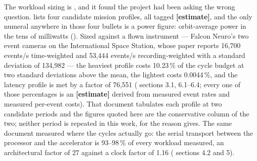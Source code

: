 The workload sizing is , and it found the project had been
asking the wrong question.  lists four candidate
mission profiles, all tagged \textbf{[estimate]}, and the only numeral
anywhere in those four bullets is a power figure: orbit-average power in
the tens of milliwatts (). Sized against a flown
instrument --- Falcon Neuro's two event cameras on the International
Space Station, whose paper reports 16{,}700 events/s time-weighted and
53{,}444 events/s recording-weighted with a standard deviation of
134{,}982 --- the heaviest profile costs 10.23\,\% of the cycle budget
at two standard deviations above the mean, the lightest costs 0.0044\,\%,
and the latency profile is met by a factor of 76{,}551
( sections 3.1, 6.1--6.4; every one of those percentages is
an \textbf{[estimate]} derived from measured event rates and measured
per-event costs). That document tabulates each profile at two candidate
periods and the figures quoted here are the conservative column of the
two; neither period is repeated in this work, for the reason
 gives. The same document measured where the cycles actually
go: the serial transport between the processor and the accelerator is
93--98\,\% of every workload measured, an architectural factor of 27
against a clock factor of 1.16 ( sections 4.2 and 5).

